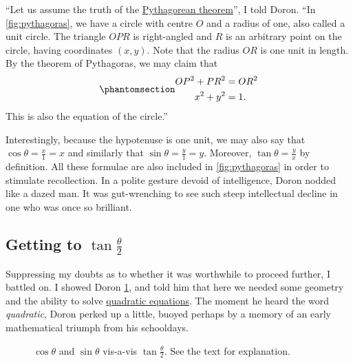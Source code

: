 \documentclass[
  a4paper,
]{article}
\begin{document}
``Let us assume the truth of the
\href{https://en.wikipedia.org/wiki/Pythagorean_theorem}{Pythagorean
theorem}'', I told Doron. ``In \cref{fig:pythagoras}, we have a circle
with centre \(O\) and a radius of one, also called a unit circle. The
triangle \(OPR\) is right-angled and \(R\) is an arbitrary point on the
circle, having coordinates \((x, y)\). Note that the radius \(OR\) is
one unit in length. By the theorem of Pythagoras, we may claim that
\begin{equation}\phantomsection\label{eq:circle}{
\begin{aligned}
OP^2 + PR^2 &= OR^2\\
x^2 + y^2 &= 1.
\end{aligned}
}\end{equation} This is also the equation of the circle.''

Interestingly, because the hypotenuse is one unit, we may also say that
\(\cos\theta = \frac{x}{1} = x\) and similarly that
\(\sin\theta = \frac{y}{1} = y\). Moreover, \(\tan\theta = \frac{y}{x}\)
by definition. All these formulae are also included in
\cref{fig:pythagoras} in order to stimulate recollection. In a polite
gesture devoid of intelligence, Doron nodded like a dazed man. It was
gut-wrenching to see such steep intellectual decline in one who was once
so brilliant.

\subsection{\texorpdfstring{Getting to
\(\tan\frac{\theta}{2}\)}{Getting to \textbackslash tan\textbackslash frac\{\textbackslash theta\}\{2\}}}\label{getting-to-tanfractheta2}

Suppressing my doubts as to whether it was worthwhile to proceed
further, I battled on. I showed Doron \cref{fig:tantheta}, and told him
that here we needed some geometry and the ability to solve
\href{https://en.wikipedia.org/wiki/Quadratic_equation}{quadratic
equations}. The moment he heard the word \emph{quadratic}, Doron perked
up a little, buoyed perhaps by a memory of an early mathematical triumph
from his schooldays.

\begin{figure}
\centering

\caption{\(\cos\theta\) and \(\sin\theta\) vis-a-vis
\(\tan\frac{\theta}{2}\). See the text for
explanation.}\label{fig:tantheta}
\end{figure}
\end{document}
